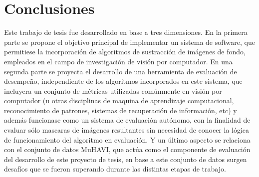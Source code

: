 \chapter{Conclusiones}\label{chap:conclusiones}



Este trabajo de tesis fue desarrollado en base a tres dimensiones. En la primera parte se propone el objetivo principal de implementar un sistema de software, que permitiese la incorporación de algoritmos de sustracción de imágenes de fondo, empleados en el campo de investigación de visión por computador. En una segunda parte se proyecta el desarrollo de una herramienta de evaluación de desempeño, independiente de los algoritmos incorporados en este sistema, que incluyera un conjunto de métricas utilizadas comúnmente en visión por computador (u otras disciplinas de maquina de aprendizaje computacional, reconocimiento de patrones, sistemas de recuperación de información, etc) y además funcionase como un sistema de evaluación autónomo, con la finalidad de evaluar sólo mascaras de imágenes resultantes sin necesidad de conocer la lógica de funcionamiento del algoritmo en evaluación. Y un último aspecto se relaciona con el conjunto de datos MuHAVI, que actúa como el componente de evaluación del desarrollo de este proyecto de tesis, en base a este conjunto de datos surgen desafíos que se fueron superando durante las distintas etapas de trabajo. 

